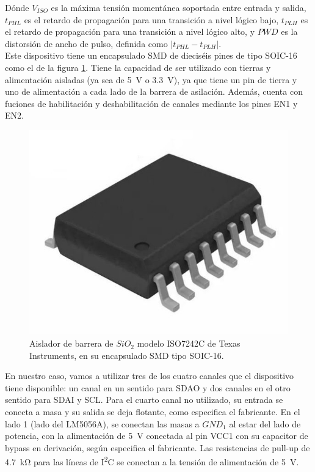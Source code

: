 Dónde $V_{ISO}$ es la máxima tensión momentánea soportada entre entrada y salida, $t_{PHL}$ es el retardo de propagación para una transición a nivel lógico bajo, $t_{PLH}$ es el retardo de propagación para una transición a nivel lógico alto, y $PWD$ es la distorsión de ancho de pulso, definida como $|t_{PHL} - t_{PLH}|$.\\

Este dispositivo tiene un encapsulado SMD de dieciséis pines de tipo SOIC-16 como el de la figura \ref{encapsulado_iso}. Tiene la capacidad de ser utilizado con tierras y alimentación aisladas (ya sea de \SI[]{5}[]{\volt} o \SI[]{3.3}[]{\volt}), ya que tiene un pin de tierra y uno de alimentación a cada lado de la barrera de asilación. Además, cuenta con fuciones de habilitación y deshabilitación de canales mediante los pines EN1 y EN2.\\

\begin{figure}[h]
    \centering
    \includegraphics[scale=0.9]{Imagenes/SOIC16.jpg}
    \caption{Aislador de barrera de $SiO_2$ modelo ISO7242C de Texas Instruments, en su encapsulado SMD tipo SOIC-16.}
    \label{encapsulado_iso}
\end{figure}

En nuestro caso, vamos a utilizar tres de los cuatro canales que el dispositivo tiene disponible: un canal en un sentido para SDAO y dos canales en el otro sentido para SDAI y SCL. Para el cuarto canal no utilizado, su entrada se conecta a masa y su salida se deja flotante, como especifica el fabricante. En el lado 1 (lado del LM5056A), se conectan las masas a $GND_1$ al estar del lado de potencia, con la alimentación de \SI[]{5}[]{\volt} conectada al pin VCC1 con su capacitor de bypass en derivación, según especifica el fabricante. Las resistencias de pull-up de \SI[]{4.7}[]{\kilo\ohm} para las líneas de I\textsuperscript{2}C se conectan a la tensión de alimentación de \SI[]{5}[]{\volt}.\\

